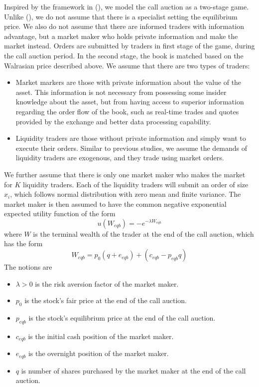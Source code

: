 \documentclass{article}
\begin{document}
Inspired by the framework in (\cite{Madhavan2015}), we model the call auction as a two-stage game. Unlike (\cite{Madhavan2015}), we do not assume that there is a specialist setting the equilibrium price. We also do not assume that there are informed traders with information advantage, but a market maker who holds private information and make the market instead. Orders are submitted by traders in first stage of the game, during the call auction period. In the second stage, the book is matched based on the Walrasian price described above. We assume that there are two types of traders:

\begin{itemize}
  \item Market markers are those with private information about the value of the asset. This information is not necessary from possessing some insider knowledge about the asset, but from having access to superior information regarding the order flow of the book, such as real-time trades and quotes provided by the exchange and better data processing capability.  
  \item Liquidity traders are those without private information and simply want to execute their orders. Similar to previous studies, we assume the demands of liquidity traders are exogenous, and they trade using market orders.
\end{itemize}

We further assume that there is only one market maker who makes the market for $K$ liquidity traders. Each of the liquidity traders will submit an order of size $x_i$, which follows normal distribution with zero mean and finite variance. The market maker is then assumed to  have the common negative exponential expected utility function of the form
\[
  u(W_{eqb}) = -e^{-\lambda W_{eqb}}
\]
where $W$ is the terminal wealth of the trader at the end of the call auction, which has the form
\[
  W_{eqb} = p_0 (q + e_{eqb}) + (c_{eqb} - p_{eqb} q)
\]
The notions are
\begin{itemize}
  \item $\lambda>0$ is the risk aversion factor of the market maker.
  \item $p_0$ is the stock's fair price at the end of the call auction.
  \item $p_{eqb}$ is the stock's equilibrium price at the end of the call auction.
  \item $c_{eqb}$ is the initial cash position of the market maker.
  \item $e_{eqb}$ is the overnight position of the market maker.
  \item $q$ is number of shares purchased by the market maker at the end of the call auction.
\end{itemize}
\end{document}
